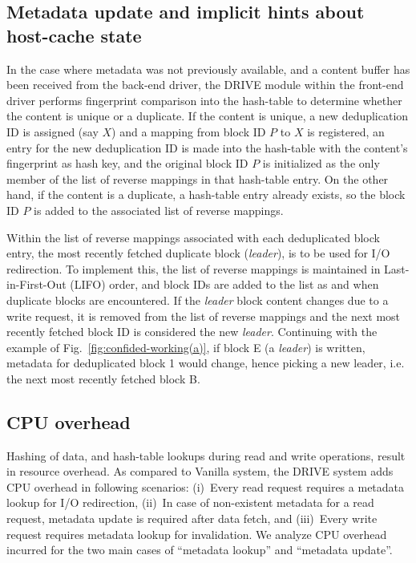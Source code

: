 \subsection{Metadata update and implicit hints about host-cache state}
In the case where metadata was not previously available, and a content
buffer has been received from the back-end driver, the DRIVE module
within the front-end driver performs fingerprint comparison into the
hash-table to determine whether the content is unique or a duplicate.
If the content is unique, a new deduplication ID is assigned (say $X$) and a
mapping from block ID $P$ to $X$ is registered, an entry for the new 
deduplication ID
is made into the hash-table with the content's fingerprint as hash key,
and the original block ID $P$ is initialized as the only member of the
list of reverse mappings in that hash-table entry.
On the other hand, if the content is a duplicate, a hash-table 
entry already exists, so the block ID $P$ is added to the associated
list of reverse mappings.

Within the list of reverse mappings associated with each deduplicated
block entry, the most recently fetched duplicate block (\textit{leader}), 
is to be used for I/O redirection. 
To implement this, the list of reverse mappings is maintained in 
Last-in-First-Out (LIFO)
order, and block IDs are added to the list
as and when duplicate blocks are encountered.
If the \textit{leader} block content
changes due to a write request, it is removed from the list of reverse
mappings and the next most recently fetched block ID is considered the 
new \textit{leader}.
Continuing with the example of Fig.~\ref{fig:confided-working(a)}, 
if block E (a \textit{leader}) is written, 
metadata for deduplicated block 1 would change,
hence picking a new leader, i.e. the next most recently fetched block B.


\subsection{CPU overhead}
\label{sec:drivechap-cpuoverhead}
Hashing of data, and hash-table lookups
during read and write operations, result in resource overhead.
As compared to Vanilla system, the DRIVE system adds CPU overhead
in following scenarios: (i)~Every read request requires a metadata
lookup for I/O redirection, (ii)~In case of non-existent metadata for a
read request, metadata update is required after data fetch, and 
(iii)~Every write request requires metadata lookup for invalidation. 
We analyze CPU overhead incurred for the two main cases of 
``metadata lookup'' and ``metadata update''.

